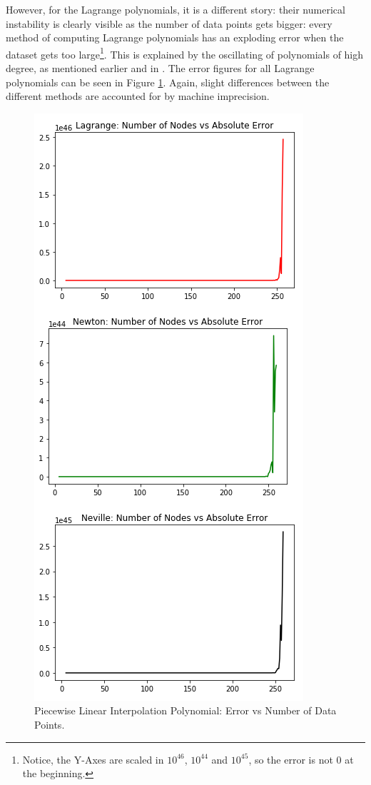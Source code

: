 \documentclass[a4paper,11pt, notitlepage]{article}
\begin{document}
\begin{onehalfspace}
However, for the Lagrange polynomials, it is a different story: their numerical instability is clearly visible as the number of data points gets bigger: every method of computing Lagrange polynomials has an exploding error when the dataset gets too large\footnote{Notice, the Y-Axes are scaled in $10^{46}$, $10^{44}$ and $10^{45}$, so the error is not 0 at the beginning.}. This is explained by the oscillating of polynomials of high degree, as mentioned earlier and in \cite{burden1985numerical}. The error figures for all Lagrange polynomials can be seen in Figure \ref{fig:lag-all-bign}. Again, slight differences between the different methods are accounted for by machine imprecision.

\begin{figure}[H]
	\centering
	\includegraphics[]{./images/lag-all-bign.png}
	\caption{Piecewise Linear Interpolation Polynomial: Error vs Number of Data Points.}
	\label{fig:lag-all-bign}
\end{figure}



\end{onehalfspace}
\end{document}
